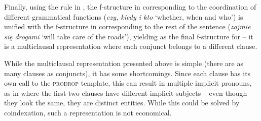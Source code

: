 \documentclass[output=paper]{../langscibook}
\begin{document}

Finally, using the rule in , the f-structure
in
corresponding to the coordination of different grammatical functions
(\emph{czy, kiedy i kto} `whether, when and who') is unified with the f-structure in
 corresponding to the rest of
the sentence (\emph{zajmie się drogami} `will take care of the roads'), yielding
 as the final f-structure for
 – it is a multiclausal representation where each
conjunct belongs to a different clause.

While the multiclausal representation presented above is simple (there
are as many clauses as conjuncts), it has some shortcomings. Since
each clause has its own call to the \textsc{prodrop} template, this
can result in multiple implicit pronouns, as in
 where the first two clauses have different
implicit subjects – even though they look the same, they are distinct
entities. While this could be solved by coindexation, such a
representation is not economical.
\end{document}
